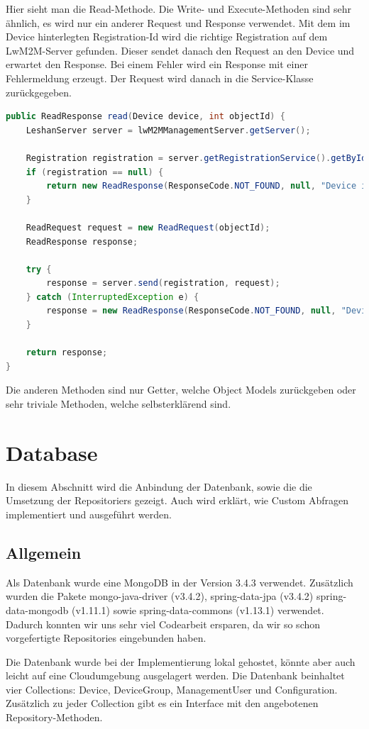 Hier sieht man die Read-Methode. Die Write- und Execute-Methoden sind sehr ähnlich, es wird nur ein anderer Request und Response verwendet. Mit dem im Device hinterlegten Registration-Id wird die richtige Registration auf dem LwM2M-Server gefunden. Dieser sendet danach den Request an den Device und erwartet den Response. Bei einem Fehler wird ein Response mit einer Fehlermeldung erzeugt. Der Request wird danach in die Service-Klasse zurückgegeben.
\begin{lstlisting}[language=java]
public ReadResponse read(Device device, int objectId) {
	LeshanServer server = lwM2MManagementServer.getServer();

	Registration registration = server.getRegistrationService().getById(device.getRegId());
	if (registration == null) {
		return new ReadResponse(ResponseCode.NOT_FOUND, null, "Device is not reachable");
	}

	ReadRequest request = new ReadRequest(objectId);
	ReadResponse response;

	try {
		response = server.send(registration, request);
	} catch (InterruptedException e) {
		response = new ReadResponse(ResponseCode.NOT_FOUND, null, "Device is not reachable");
	}

	return response;
}
\end{lstlisting}

Die anderen Methoden sind nur Getter, welche Object Models zurückgeben oder sehr triviale Methoden, welche selbsterklärend sind.

\newpage

\section{Database}
In diesem Abschnitt wird die Anbindung der Datenbank, sowie die die Umsetzung der Repositoriers gezeigt. Auch wird erklärt, wie Custom Abfragen implementiert und ausgeführt werden. 
\subsection{Allgemein}
Als Datenbank wurde eine MongoDB in der Version 3.4.3 verwendet. Zusätzlich wurden die Pakete mongo-java-driver (v3.4.2), spring-data-jpa (v3.4.2) spring-data-mongodb (v1.11.1) sowie spring-data-commons (v1.13.1) verwendet. Dadurch konnten wir uns sehr viel Codearbeit ersparen, da wir so schon vorgefertigte Repositories eingebunden haben.

Die Datenbank wurde bei der Implementierung lokal gehostet, könnte aber auch leicht auf eine Cloudumgebung ausgelagert werden. Die Datenbank beinhaltet vier Collections: Device, DeviceGroup, ManagementUser und Configuration. Zusätzlich zu jeder Collection gibt es ein Interface mit den angebotenen Repository-Methoden.
